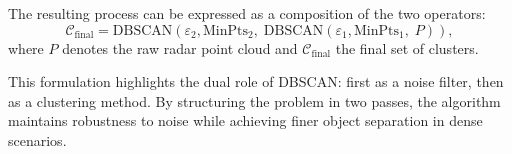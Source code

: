 The resulting process can be expressed as a composition of the two operators:
\begin{equation}
    \mathcal{C}_{\text{final}} = \text{DBSCAN}(\varepsilon_2, \text{MinPts}_2, \; \text{DBSCAN}(\varepsilon_1, \text{MinPts}_1, \; P)),
\end{equation}
where $P$ denotes the raw radar point cloud and $\mathcal{C}_{\text{final}}$ the final set of clusters.  

This formulation highlights the dual role of DBSCAN: first as a noise filter, then as a clustering method.  
By structuring the problem in two passes, the algorithm maintains robustness to noise while achieving finer object separation in dense scenarios.
